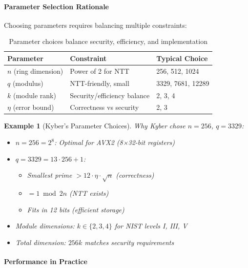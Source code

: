 \documentclass[11pt,a4paper]{article}
\newtheorem{example}{Example}
\begin{document}
\paragraph{Parameter Selection Rationale}

Choosing parameters requires balancing multiple constraints:

\begin{table}[h]
\centering
\begin{tabular}{|l|l|l|}
\hline
\textbf{Parameter} & \textbf{Constraint} & \textbf{Typical Choice} \\
\hline
$n$ (ring dimension) & Power of 2 for NTT & 256, 512, 1024 \\
$q$ (modulus) & NTT-friendly, small & 3329, 7681, 12289 \\
$k$ (module rank) & Security/efficiency balance & 2, 3, 4 \\
$\eta$ (error bound) & Correctness vs security & 2, 3 \\
\hline
\end{tabular}
\caption{Parameter choices balance security, efficiency, and implementation}
\end{table}

\begin{example}[Kyber's Parameter Choices]
Why Kyber chose $n = 256$, $q = 3329$:
\begin{itemize}
    \item $n = 256 = 2^8$: Optimal for AVX2 (8×32-bit registers)
    \item $q = 3329 = 13 \cdot 256 + 1$: 
    \begin{itemize}
        \item Smallest prime $> 12 \cdot \eta \cdot \sqrt{n}$ (correctness)
        \item $= 1 \bmod 2n$ (NTT exists)
        \item Fits in 12 bits (efficient storage)
    \end{itemize}
    \item Module dimensions: $k \in \{2, 3, 4\}$ for NIST levels I, III, V
    \item Total dimension: $256k$ matches security requirements
\end{itemize}
\end{example}

\paragraph{Performance in Practice}
\end{document}
